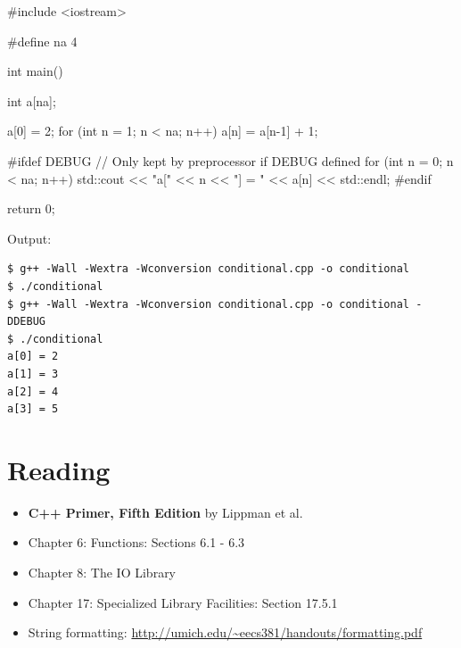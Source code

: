 \documentclass[12pt,letterpaper,twoside]{article}
\begin{document}
\begin{cpp}
#include <iostream>

#define na 4

int main() {
  int a[na];

  a[0] = 2;
  for (int n = 1; n < na; n++) a[n] = a[n-1] + 1;

#ifdef DEBUG
  // Only kept by preprocessor if DEBUG defined
  for (int n = 0; n < na; n++) {
    std::cout << "a[" << n << "] = " << a[n] << std::endl;
  }
#endif

  return 0;
}
\end{cpp}

Output:

\begin{verbatim}
$ g++ -Wall -Wextra -Wconversion conditional.cpp -o conditional
$ ./conditional
$ g++ -Wall -Wextra -Wconversion conditional.cpp -o conditional -DDEBUG
$ ./conditional
a[0] = 2
a[1] = 3
a[2] = 4
a[3] = 5
\end{verbatim}

\section{Reading}
\begin{itemize}
\item
  \textbf{C++ Primer, Fifth Edition} by Lippman et al.
\item
  Chapter 6: Functions: Sections 6.1 - 6.3
\item
  Chapter 8: The IO Library
\item
  Chapter 17: Specialized Library Facilities: Section 17.5.1
\item String formatting: \url{http://umich.edu/~eecs381/handouts/formatting.pdf}
\end{itemize}
\end{document}
